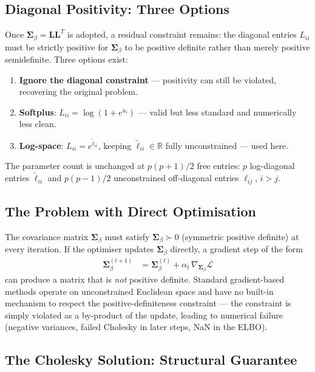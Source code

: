 \documentclass[11pt,a4paper]{article}
\newcommand{\R}{\mathbb{R}}
\begin{document}
\subsection*{Diagonal Positivity: Three Options}

Once $\bm{\Sigma}_\beta = \bm{L}\bm{L}^T$ is adopted, a residual constraint remains: the diagonal entries $L_{ii}$ must be strictly positive for $\bm{\Sigma}_\beta$ to be positive definite rather than merely positive semidefinite. Three options exist:
\begin{enumerate}
  \item \textbf{Ignore the diagonal constraint} --- positivity can still be violated, recovering the original problem.
  \item \textbf{Softplus}: $L_{ii} = \log(1 + e^{u_i})$ --- valid but less standard and numerically less clean.
  \item \textbf{Log-space}: $L_{ii} = e^{\tilde{\ell}_{ii}}$, keeping $\tilde{\ell}_{ii} \in \R$ fully unconstrained --- used here.
\end{enumerate}
The parameter count is unchanged at $p(p+1)/2$ free entries: $p$ log-diagonal entries $\tilde{\ell}_{ii}$ and $p(p-1)/2$ unconstrained off-diagonal entries $\ell_{ij}$, $i > j$.

\subsection*{The Problem with Direct Optimisation}

The covariance matrix $\bm{\Sigma}_\beta$ must satisfy $\bm{\Sigma}_\beta \succ 0$ (symmetric positive definite) at every iteration. If the optimiser updates $\bm{\Sigma}_\beta$ directly, a gradient step of the form
\begin{align}
  \bm{\Sigma}_\beta^{(t+1)} &= \bm{\Sigma}_\beta^{(t)} + \alpha_t \,\nabla_{\bm{\Sigma}_\beta}\mathcal{L}
\end{align}
can produce a matrix that is \emph{not} positive definite. Standard gradient-based methods operate on unconstrained Euclidean space and have no built-in mechanism to respect the positive-definiteness constraint --- the constraint is simply violated as a by-product of the update, leading to numerical failure (negative variances, failed Cholesky in later steps, NaN in the ELBO).

\subsection*{The Cholesky Solution: Structural Guarantee}
\end{document}
